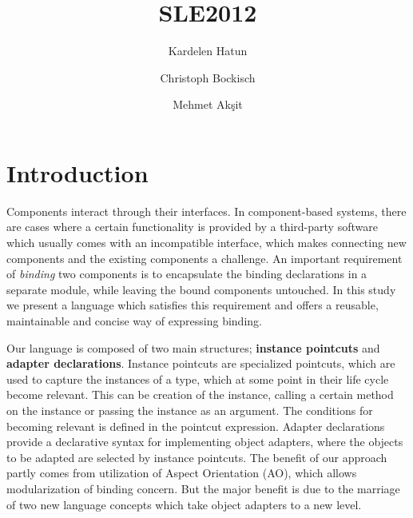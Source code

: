 \documentclass{llncs}
\begin{document}

\title{SLE2012}

\author{Kardelen Hatun \and Christoph Bockisch \and Mehmet Ak\c{s}it}

\maketitle
\section{Introduction}

Components interact through their interfaces. In component-based systems, there are cases where a certain functionality is provided by a third-party software which usually comes with an incompatible interface, which makes connecting new components and the existing components a challenge.  An important requirement of \emph{binding} two components is to encapsulate the binding declarations in a separate module, while leaving the bound components untouched.  In this study we present a language which satisfies this requirement and offers a reusable, maintainable and concise way of expressing binding.

Our language is composed of two main structures; \textbf{instance pointcuts} and \textbf{adapter declarations}. Instance pointcuts are specialized pointcuts, which are used to capture the instances of a type, which at some point in their life cycle become relevant. This can be creation of the instance, calling a certain method on the instance or passing the instance as an argument. The conditions for becoming relevant is defined in the pointcut expression. Adapter declarations provide a declarative syntax for implementing object adapters, where the objects to be adapted are selected by instance pointcuts. The benefit of our approach partly comes from utilization of Aspect Orientation (AO), which allows modularization of binding concern. But the major benefit is due to the marriage of two new language concepts which take object adapters to a new level. 
\end{document}
